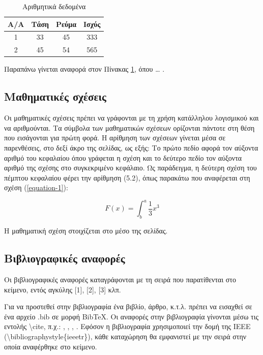 \documentclass[twoside, a4paper, 11pt]{article}
\begin{document}
\clearpage

\begin{table}[!t]
\caption{Αριθμητικά δεδομένα}
\centering
\tabcolsep=0.5cm
\begin{adjustbox}{width=0.5 \textwidth}
    \begin{tabular}{|c|c|c|c|}
        \hline
        A/A & Τάση & Ρεύμα & Ισχύς \\ \hline
        1   & 33   & 45    & 333   \\ \hline
        2   & 45   & 54    & 565   \\ \hline
    \end{tabular}
\end{adjustbox}
\label{table:arithmetic-data}
\end{table}

Παραπάνω γίνεται αναφορά στον Πίνακας \ref{table:arithmetic-data}, όπου … .

\subsection{Μαθηματικές σχέσεις}
\label{subsection:rcpm2}
Οι μαθηματικές σχέσεις πρέπει να γράφονται με τη χρήση κατάλληλου λογισμικού και να αριθμούνται. Τα σύμβολα των μαθηματικών σχέσεων ορίζονται πάντοτε στη θέση που εισάγονται για πρώτη φορά. Η αρίθμηση των σχέσεων γίνεται μέσα σε παρενθέσεις, στο δεξί άκρο της σελίδας, ως εξής: Το πρώτο πεδίο αφορά τον αύξοντα αριθμό του κεφαλαίου όπου γράφεται η σχέση και το δεύτερο πεδίο τον αύξοντα αριθμό της σχέσης στο συγκεκριμένο κεφάλαιο. Ως παράδειγμα, η δεύτερη σχέση του πέμπτου κεφαλαίου φέρει την αρίθμηση (5.2), όπως παρακάτω που αναφέρεται στη σχέση (\ref{equation-1}):

\[F(x) = \int^a_b \frac{1}{3}x^3 \tag{3.1} \label{equation-1}\]

Η μαθηματική σχέση στοιχίζεται στο μέσο της σελίδας.

\subsection{Βιβλιογραφικές αναφορές} \label{subsection:rcpm-smote}
Οι βιβλιογραφικές αναφορές καταγράφονται με τη σειρά που παρατίθενται στο κείμενο, εντός αγκύλης [1], [2], [3] κλπ.

Για να προστεθεί στην βιβλιογραφία ένα βιβλίο, άρθρο, κ.τ.λ. πρέπει να εισαχθεί σε ένα αρχείο .bib σε μορφή BibTeX. Οι αναφορές στην βιβλιογραφία γίνονται μέσω τις εντολής \textbackslash cite, π.χ.: \cite{einstein}, \cite{sensory-receptors}, \cite{knuthwebsite}, \cite{knuth-fa}. Εφόσον η βιβλιογραφία χρησιμοποιεί την δομή της IEEE (\textbackslash bibliographystyle\{ieeetr\}), κάθε καταχώρηση θα εμφανιστεί με την σειρά στην οποία αναφέρθηκε στο κείμενο.
\end{document}
